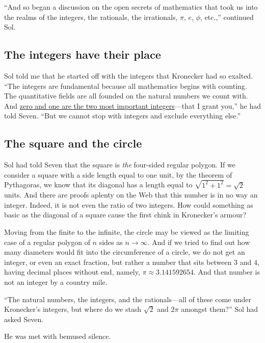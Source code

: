 \documentclass[
  a4paper,
]{article}
\begin{document}
``And so began a discussion on the open secrets of mathematics that took
us into the realms of the integers, the rationals, the irrationals,
\(\pi\), \(e\), \(\phi\), etc.,'' continued Sol.

\subsection{The integers have their
place}\label{the-integers-have-their-place}

Sol told me that he started off with the integers that Kronecker had so
exalted. ``The integers are fundamental because all mathematics begins
with counting. The quantitative fields are all founded on the natural
numbers we count with. And
\href{https://swanlotus.netlify.app/blogs/the-two-most-important-numbers-zero-and-one}{zero
and one are the two most important integers}---that I grant you,'' he
had told Seven. ``But we cannot stop with integers and exclude
everything else.''

\subsection{The square and the circle}\label{the-square-and-the-circle}

Sol had told Seven that the square is \emph{the} four-sided regular
polygon. If we consider a square with a side length equal to one unit,
by the theorem of Pythagoras, we know that its diagonal has a length
equal to \(\sqrt{1^2 + 1^2} = \sqrt{2}\) units. And there are proofs
aplenty on the Web that this number is in no way an integer. Indeed, it
is not even the ratio of two integers. How could something as basic as
the diagonal of a square cause the first chink in Kronecker's armour?

Moving from the finite to the infinite, the circle may be viewed as the
limiting case of a regular polygon of \(n\) sides as \(n \to \infty\).
And if we tried to find out how many diameters would fit into the
circumference of a circle, we do not get an integer, or even an exact
fraction, but rather a number that sits between \(3\) and \(4\), having
decimal places without end, namely, \(\pi \approx 3.141592654\). And
that number is not an integer by a country mile.

``The natural numbers, the integers, and the rationals---all of these
come under Kronecker's integers, but where do we stash \(\sqrt{2}\) and
\(2\pi\) amongst them?'' Sol had asked Seven.

He was met with bemused silence.
\end{document}
